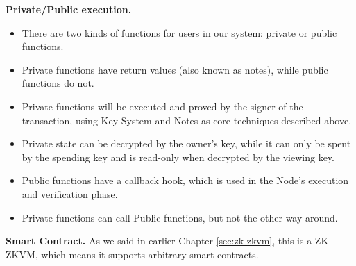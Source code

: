 \textbf{Private/Public execution.}
\begin{itemize}
    \item There are two kinds of functions for users in our system: private or public functions.
    \item Private functions have return values (also known as notes), while public functions do not.
    \item Private functions will be executed and proved by the signer of the transaction, using Key System and Notes as core techniques described above.
    \item Private state can be decrypted by the owner's key, while it can only be spent by the spending key and is read-only when decrypted by the viewing key.
    \item Public functions have a callback hook, which is used in the Node's execution and verification phase.
    \item Private functions can call Public functions, but not the other way around.
\end{itemize}
\bigskip

\textbf{Smart Contract.} As we said in earlier Chapter \ref{sec:zk-zkvm}, this is a ZK-ZKVM, which means it supports arbitrary smart contracts.